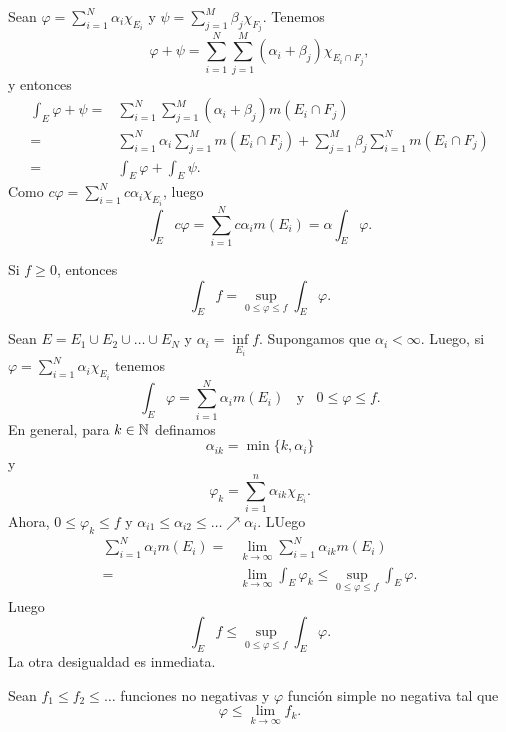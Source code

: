     \begin{demo}
    Sean $\varphi=\sum\limits_{i=1}^N \alpha_i \chi_{E_i}$ y $\psi=\sum\limits_{j=1}^M \beta_j \chi_{F_j}$. 
    Tenemos 
    \[
    \varphi+\psi=
    \sum\limits_{i=1}^N\sum\limits_{j=1}^M (\alpha_i+\beta_j) \chi_{E_i \cap F_j},
    \]
    y entonces
    \[
    \begin{split}
    \int_E \varphi+\psi=& 
    \sum\limits_{i=1}^N\sum\limits_{j=1}^M (\alpha_i+\beta_j) m(E_i \cap F_j)
    \\
    =&\sum\limits_{i=1}^N \alpha_i \sum\limits_{j=1}^M m(E_i \cap F_j)+
    \sum\limits_{j=1}^M \beta_j \sum\limits_{i=1}^N m(E_i \cap F_j)
    \\
    =&\int_E \varphi +\int_E \psi.
    \end{split}
        \]
    Como $c\varphi=\sum\limits_{i=1}^N c \alpha_i \chi_{E_i}$, luego
    \[
    \int_E c\varphi = \sum\limits_{i=1}^N c\alpha_i m(E_i)=\alpha \int_E \varphi.
    \]
    \end{demo}
    
    \begin{teorema}{}
    Si $f\geq 0$, entonces
    \[\int_E f = \sup\limits_{0\leq \varphi\leq f} \int_E \varphi.\]
    \end{teorema}
    
    \begin{demo}
    Sean $E=E_1\cup E_2\cup\ldots \cup E_N$ y $\alpha_i=\inf\limits_{E_i} f$. 
    Supongamos que $\alpha_i<\infty$. Luego, si $\varphi=\sum\limits_{i=1}^N \alpha_i \chi_{E_i}$ tenemos 
    \[
    \int_E \varphi =\sum\limits_{i=1}^N \alpha_i m(E_i)\;\;
    \mbox{ y }\;\; 0\leq \varphi \leq f.
    \]
    En general, para $k\in \mathbb{N}$ definamos 
    \[\alpha_{ik}=\min\{k,\alpha_i\}\]
    y 
    \[ \varphi_k=\sum\limits_{i=1}^n \alpha_{ik} \chi_{E_i}.\]
    Ahora, $0\leq \varphi_k \leq f$ y $\alpha_{i1}\leq \alpha_{i2}\leq \ldots \nearrow \alpha_i$. 
    LUego 
    \[
    \begin{split}
    \sum\limits_{i=1}^N \alpha_i m(E_i)=&
    \lim\limits_{k \to \infty} \sum\limits_{i=1}^N \alpha_{ik} m(E_i)
    \\
    =&\lim\limits_{k \to \infty} \int_E \varphi_k 
     \leq  \sup\limits_{0\leq \varphi \leq f} \int_E \varphi.
    \end{split}
    \]
    Luego
    \[
    \int_E f \leq \sup\limits_{0\leq \varphi \leq f} \int_E \varphi.
    \]    
    La otra desigualdad es inmediata.
    \end{demo}
    
    
    \begin{lema}{}
    Sean $f_1\leq f_2\leq \ldots$ funciones no negativas y $\varphi$ funci\'on simple no negativa tal que 
    \[
    \varphi \leq \lim\limits_{k \to \infty} f_k.
    \]
    \end{lema}
    
